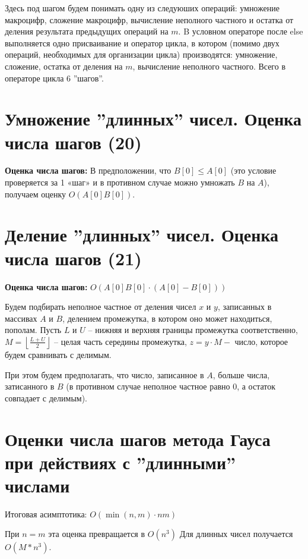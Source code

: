 \documentclass[40pt]{article}
\begin{document}
Здесь под шагом будем понимать одну из следуюших операций: умножение макроцифр, сложение макроцифр, вычисление неполного частного и остатка от деления результата предыдущих операций на $m$. B условном операторе после else выполняется одно присваивание и оператор цикла, в котором (помимо двух операций, необходимых для организации цикла) производятся: умножение, сложение, остатка от деления на $m$, вычисление неполного частного. Всего в операторе цикла 6 ''шагов''.



\section{Умножение ''длинных'' чисел. Оценка числа шагов (20)}

\textbf{Оценка числа шагов:} В предположении, что $B[0] \leq A[0]$ (это условие проверяется за 1 «шаг» и в противном случае можно умножать $B$ на $A$), получаем оценку $O(A[0] B[0])$.


\section{Деление ''длинных'' чисел. Оценка числа шагов (21)}

\textbf{Оценка числа шагов:} $O (A[0] B[0] \cdot(A[0]-B[0]))$

Будем подбирать неполное частное от деления чисел $x$ и $y$, записанных в массивах $A$ и $B$, делением промежутка, в котором оно может находиться, пополам. Пусть $L$ и $U$ -- нижняя и верхняя границы промежутка соответственно, $M=\left\lfloor\frac{L+U}{2}\right\rfloor$ -- целая часть середины промежутка, $z=y \cdot M-$ число, которое будем сравнивать с делимым.

При этом будем предполагать, что число, записанное в $A$, больше числа, затисанного в $B$ (в противном случае неполное частное равно 0, а остаток совпадает с делимым).







\section{Оценки числа шагов метода Гауса при действиях с ''длинными'' числами}


Итоговая асимптотика: $O(\min (n, m) \cdot n m)$

При $n=m$ эта оценка превращается в $O(n^{3})$
Для длинных чисел получается $O(M*n^{3})$. 
\end{document}
